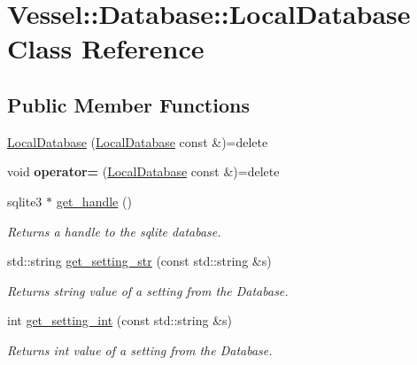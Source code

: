 \hypertarget{class_vessel_1_1_database_1_1_local_database}{}\section{Vessel\+:\+:Database\+:\+:Local\+Database Class Reference}
\label{class_vessel_1_1_database_1_1_local_database}
\subsection*{Public Member Functions}
\begin{DoxyCompactItemize}
\item 
\hyperlink{class_vessel_1_1_database_1_1_local_database_af2180ec115f920bb5cf9915da9873478}{Local\+Database} (\hyperlink{class_vessel_1_1_database_1_1_local_database}{Local\+Database} const \&)=delete
\item 
\mbox{\label{class_vessel_1_1_database_1_1_local_database_a498009e5019d6412452f763ea06515c1}} 
void {\bfseries operator=} (\hyperlink{class_vessel_1_1_database_1_1_local_database}{Local\+Database} const \&)=delete
\item 
sqlite3 $\ast$ \hyperlink{class_vessel_1_1_database_1_1_local_database_a7df737694e981572b00a3a9b9d0a7eeb}{get\+\_\+handle} ()
\begin{DoxyCompactList}\small\item\em Returns a handle to the sqlite database. \end{DoxyCompactList}\item 
std\+::string \hyperlink{class_vessel_1_1_database_1_1_local_database_aaeca7268517cb884b7aa7ea4b7f3db04}{get\+\_\+setting\+\_\+str} (const std\+::string \&s)
\begin{DoxyCompactList}\small\item\em Returns string value of a setting from the Database. \end{DoxyCompactList}\item 
int \hyperlink{class_vessel_1_1_database_1_1_local_database_af37832c98d2e9eabe40b2a45f5035133}{get\+\_\+setting\+\_\+int} (const std\+::string \&s)
\begin{DoxyCompactList}\small\item\em Returns int value of a setting from the Database. \end{DoxyCompactList}\item 

\end{DoxyCompactItemize}
